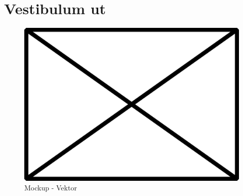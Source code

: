 \section{Vestibulum ut}
\lipsum[6]

\begin{figure}[H]
   \centering
   \includegraphics[width=14cm]{images/mockup_vector.eps}
   \caption{Mockup - Vektor}
\end{figure}